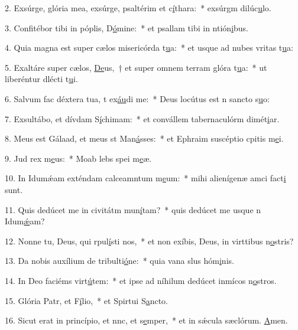 2. Exsúrge, glória mea, exsúrge, psaltérim et c\uline{í}thara:~* exsúrgm dilúc\uline{u}lo.\par 
3. Confitébor tibi in póplis, D\uline{ó}mine:~* et psallam tibi in ntión\uline{i}bus.\par 
4. Quia magna est super cælos misericórda t\uline{u}a:~* et usque ad nubes vritas t\uline{u}a:\par 
5. Exaltáre super cælos, \uline{De}us,~† et super omnem terram glóra t\uline{u}a:~* ut liberéntur dlécti t\uline{u}i.\par 
6. Salvum fac déxtera tua, t ex\uline{áu}di me:~* Deus locútus est n sancto s\uline{u}o:\par 
7. Exsultábo, et dívdam S\uline{í}chimam:~* et convállem tabernaculórm dimét\uline{i}ar.\par 
8. Meus est Gálaad, et meus st Man\uline{á}sses:~* et Ephraim suscéptio cpitis m\uline{e}i.\par 
9. Jud rex m\uline{e}us:~* Moab lebs spei m\uline{e}æ.\par 
10. In Idumǽam exténdam calceamntum m\uline{e}um:~* mihi alienígenæ amci fact\uline{i} sunt.\par 
11. Quis dedúcet me in civitátm mun\uline{í}tam?~* quis dedúcet me usque n Idum\uline{ǽ}am?\par 
12. Nonne tu, Deus, qui rpul\uline{í}sti nos,~* et non exíbis, Deus, in virttibus n\uline{o}stris?\par 
13. Da nobis auxílium de tribulti\uline{ó}ne:~* quia vana slus hóm\uline{i}nis.\par 
14. In Deo faciéms virt\uline{ú}tem:~* et ipse ad níhilum dedúcet inmícos n\uline{o}stros.\par 
15. Glória Patr, et F\uline{í}lio,~* et Spirtui S\uline{a}ncto.\par 
16. Sicut erat in princípio, et nnc, et s\uline{e}mper,~* et in sǽcula sæclórum. \uline{A}men.\par 
